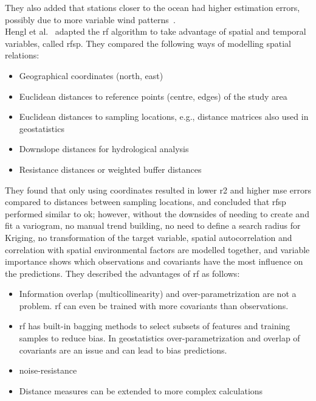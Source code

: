 They also added that stations closer to the ocean had higher estimation errors, possibly due to more variable wind patterns~\cite{runnalls2000dynamics}.\\
Hengl et al.~\cite{hengl2018random} adapted the \gls{rf} algorithm to take advantage of spatial and temporal variables, called \gls{rfsp}. They compared the following ways of modelling spatial relations:

\begin{itemize}
    \item Geographical coordinates (north, east)
    \item Euclidean distances to reference points (centre, edges) of the study area 
    \item Euclidean distances to sampling locations, e.g., distance matrices also used in geostatistics
    \item Downslope distances for hydrological analysis
    \item Resistance distances or weighted buffer distances
\end{itemize}

They found that only using coordinates resulted in lower \gls{r2} and higher \gls{mse} errors compared to distances between sampling locations, and concluded that \gls{rfsp} performed similar to \gls{ok}; however, without the downsides of needing to create and fit a variogram, no manual trend building, no need to define a search radius for Kriging, no transformation of the target variable, spatial autocorrelation and correlation with spatial environmental factors are modelled together, and variable importance shows which observations and covariants have the most influence on the predictions. They described the advantages of \gls{rf} as follows:

\begin{itemize}
    \item Information overlap (multicollinearity) and over-parametrization are not a problem. \gls{rf} can even be trained with more covariants than observations.
    \item \gls{rf} has built-in bagging methods to select subsets of features and training samples to reduce bias. In geostatistics over-parametrization and overlap of covariants are an issue and can lead to bias predictions.
    \item noise-resistance~\cite{strobl2007bias}
    \item Distance measures can be extended to more complex calculations
\end{itemize}

